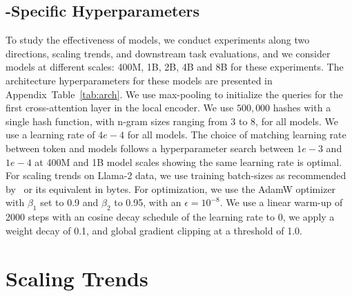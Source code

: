 \documentclass[]{fairmeta}
\begin{document}
\subsection{\model{}-Specific Hyperparameters} To study the effectiveness of \model{} models, we conduct experiments along two directions, scaling trends, and downstream task evaluations, and we consider models at different scales: 400M, 1B, 2B, 4B and 8B for these experiments. The architecture hyperparameters for these models are presented in Appendix~Table~\ref{tab:arch}. 
We use max-pooling to initialize the queries for the first cross-attention layer in the local encoder. We use $500,000$ hashes with a single hash function, with n-gram sizes ranging from 3 to 8, for all  \model{} models. We use a learning rate of $4e-4$ for all models. The choice of matching learning rate between token and \model{} models follows a hyperparameter search between $1e-3$ and $1e-4$ at 400M and 1B model scales showing the same learning rate is optimal.
For scaling trends on Llama-2 data, we use training batch-sizes as recommended by~\cite{dubey2024llama} or its equivalent in bytes. For optimization, we use the AdamW optimizer~\citep{adamw} with $\beta_1$ set to 0.9 and $\beta_2$ to 0.95, with an $\epsilon=10^{-8}$. We use a linear warm-up of 2000 steps with an cosine decay schedule of the learning rate to 0, we apply a weight decay of 0.1, and global gradient clipping at a threshold of 1.0. 


\section{Scaling Trends}
\label{section:scaling}
\end{document}
